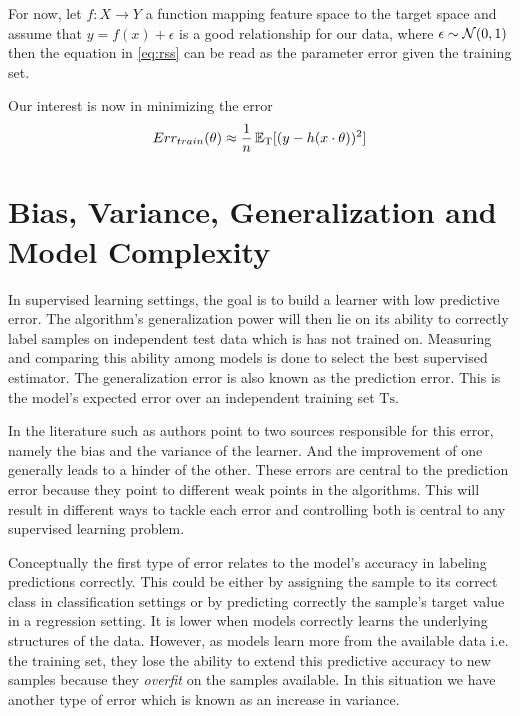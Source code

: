For now, let $f: X \rightarrow Y$ a function mapping feature space to the target space and assume that $y  =  f(x)  +  \epsilon $ is a good relationship for our data, where $\epsilon \sim \operatorname{\mathcal{N}}(0,1) $ then the equation in \ref{eq:rss} can be read as the parameter error given the training set.

Our interest is now in minimizing the error
\begin{equation}
Err_{train}(\theta) \approx \frac{1}{n} \operatorname{\mathbb{E}}_{ \mathrm{T}}[(y - h(x \cdot \theta) )^2]
\end{equation}


\section{Bias, Variance, Generalization and Model Complexity}\label{section-biasVariance}

In supervised learning settings, the goal is to build a learner with low predictive error. The algorithm's generalization power will then lie on its ability to correctly label samples on independent test data which is has not trained on. Measuring and comparing this ability among models is done to select the best supervised estimator. The generalization error is also known as the prediction error. This is the model's expected error over an independent training set $\mathrm{Ts}$.

In the literature such as \textcite{james-biasVarianceGeneral} authors point to two sources responsible for this error, namely the bias and the variance of the learner. And the improvement of one generally leads to a hinder of the other. These errors are central to the prediction error because they point to different weak points in the algorithms. This will result in different ways to tackle each error and controlling both is central to any supervised learning problem.

Conceptually the first type of error relates to the model's accuracy in labeling predictions correctly. This could be either by assigning the sample to its correct class in classification settings or by predicting correctly the sample's target value in a regression setting. It is lower when models correctly learns the underlying structures of the data. However, as models learn more from the available data i.e. the training set, they lose the ability to extend this predictive accuracy to new samples because they \textit{overfit} on the samples available. In this situation we have another type of error which is known as an increase in variance.

